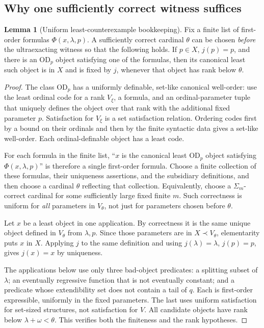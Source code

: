 \documentclass[11pt,letterpaper]{article}
\theoremstyle{definition}
\newtheorem{lemma}[definition]{Lemma}
\numberwithin{equation}{section}
\newcommand{\OD}{\mathrm{OD}}
\begin{document}
\subsection{Why one sufficiently correct witness suffices}

\begin{lemma}[Uniform least-counterexample bookkeeping]\label{lem:least}
Fix a finite list of first-order formulas $\Phi(x,\lambda,p)$. A sufficiently correct cardinal $\theta$ can be chosen \emph{before} the ultraexacting witness so that the following holds. If $p\in X$, $j(p)=p$, and there is an $\OD_p$ object satisfying one of the formulas, then its canonical least such object is in $X$ and is fixed by $j$, whenever that object has rank below $\theta$.
\end{lemma}

\begin{proof}
The class $\OD_p$ has a uniformly definable, set-like canonical well-order: use the least ordinal code for a rank $V_\xi$, a formula, and an ordinal-parameter tuple that uniquely defines the object over that rank with the additional fixed parameter $p$. Satisfaction for $V_\xi$ is a set satisfaction relation. Ordering codes first by a bound on their ordinals and then by the finite syntactic data gives a set-like well-order. Each ordinal-definable object has a least code.

For each formula in the finite list, ``$x$ is the canonical least $\OD_p$ object satisfying $\Phi(x,\lambda,p)$'' is therefore a single first-order formula. Choose a finite collection of these formulas, their uniqueness assertions, and the subsidiary definitions, and then choose a cardinal $\theta$ reflecting that collection. Equivalently, choose a $\Sigma_m$-correct cardinal for some sufficiently large fixed finite $m$. Such correctness is uniform for \emph{all} parameters in $V_\theta$, not just for parameters chosen before $\theta$.

Let $x$ be a least object in one application. By correctness it is the same unique object defined in $V_\theta$ from $\lambda,p$. Since those parameters are in $X\prec V_\theta$, elementarity puts $x$ in $X$. Applying $j$ to the same definition and using $j(\lambda)=\lambda$, $j(p)=p$, gives $j(x)=x$ by uniqueness.

The applications below use only three bad-object predicates: a splitting subset of $\lambda$; an eventually regressive function that is not eventually constant; and a predicate whose extendibility set does not contain a tail of $q$. Each is first-order expressible, uniformly in the fixed parameters. The last uses uniform satisfaction for set-sized structures, not satisfaction for $V$. All candidate objects have rank below $\lambda+\omega<\theta$. This verifies both the finiteness and the rank hypotheses.
\end{proof}
\end{document}
